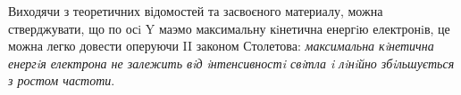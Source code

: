 \documentclass[a4paper,14pt]{extreport}
\begin{document}
	Виходячи з теоретичних відомостей та засвоєного материалу, можна стверджувати, що по осi Y маэмо максимальну кiнетична енергiю електронiв, це можна легко довести оперуючи II законом Столетова: 
	\emph{ максимальна кiнетична енергiя електрона не залежить
	вiд iнтенсивностi свiтла i лiнiйно збiльшується з ростом частоти}.

\end{document}
